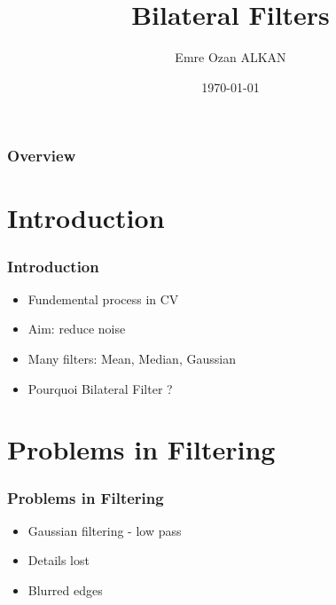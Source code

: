 \documentclass{beamer}
\title[Advanced Image Analysis]{Bilateral Filters} %
\author{Emre Ozan ALKAN} %
\institute[MSCV] %
{
University of Burgundy \\ %
\medskip
\textit{emreozanalkan@gmail.com} %
}
\date{\today} %
\begin{document}
\begin{frame}
\titlepage %
\end{frame}

\begin{frame}
\frametitle{Overview} %
\tableofcontents %
\end{frame}


\section{Introduction}

\begin{frame}
\frametitle{Introduction}
\begin{itemize}
	\item Fundemental process in CV
	\pause
	\item Aim: reduce noise
	\pause
	\item Many filters: Mean, Median, Gaussian
	\pause
	\item Pourquoi Bilateral Filter ?
\end{itemize}
\end{frame}

\section{Problems in Filtering}

\begin{frame}
\frametitle{Problems in Filtering}
\begin{itemize}
	\item Gaussian filtering - low pass
	\pause
	\item Details lost
	\pause
	\item Blurred edges
\end{itemize}
\end{frame}
\end{document}
